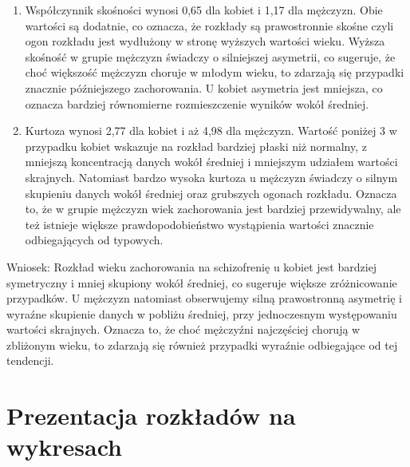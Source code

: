 \documentclass{mwart}
\begin{document}
	\begin{enumerate}
		\item Współczynnik skośności wynosi 0,65 dla kobiet i 1,17 dla mężczyzn. Obie wartości są dodatnie, co oznacza, że rozkłady są prawostronnie skośne czyli ogon rozkładu jest wydłużony w stronę wyższych wartości wieku. Wyższa skośność w grupie mężczyzn świadczy o silniejszej asymetrii, co sugeruje, że choć większość mężczyzn choruje w młodym wieku, to zdarzają się przypadki znacznie późniejszego zachorowania. U kobiet asymetria jest mniejsza, co oznacza bardziej równomierne rozmieszczenie wyników wokół średniej.
		
		\item Kurtoza wynosi 2,77 dla kobiet i aż 4,98 dla mężczyzn. Wartość poniżej 3 w przypadku kobiet wskazuje na rozkład bardziej płaski niż normalny, z mniejszą koncentracją danych wokół średniej i mniejszym udziałem wartości skrajnych. Natomiast bardzo wysoka kurtoza u mężczyzn świadczy o silnym skupieniu danych wokół średniej oraz grubszych ogonach rozkładu. Oznacza to, że w grupie mężczyzn wiek zachorowania jest bardziej przewidywalny, ale też istnieje większe prawdopodobieństwo wystąpienia wartości znacznie odbiegających od typowych.
	\end{enumerate}
	\noindent
	Wniosek: Rozkład wieku zachorowania na schizofrenię u kobiet jest bardziej symetryczny i mniej skupiony wokół średniej, co sugeruje większe zróżnicowanie przypadków. U mężczyzn natomiast obserwujemy silną prawostronną asymetrię i wyraźne skupienie danych w pobliżu średniej, przy jednoczesnym występowaniu wartości skrajnych. Oznacza to, że choć mężczyźni najczęściej chorują w zbliżonym wieku, to zdarzają się również przypadki wyraźnie odbiegające od tej tendencji.
	\newpage
	\section{Prezentacja rozkładów na wykresach}
\end{document}
